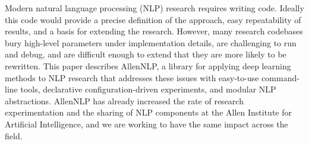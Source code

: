 Modern natural language processing (NLP) research requires writing code. Ideally this code would provide a precise definition of the approach, easy repeatability of results, and a basis for extending the research. However, many research codebases bury high-level parameters under implementation details, are challenging to run and debug, and are difficult enough to extend that they are more likely to be rewritten. This paper describes AllenNLP, a library for applying deep learning methods to NLP research that addresses these issues with easy-to-use command-line tools, declarative configuration-driven experiments, and modular NLP abstractions. AllenNLP has already increased the rate of research experimentation and the sharing of NLP components at the Allen Institute for Artificial Intelligence, and we are working to have the same impact across the field.
